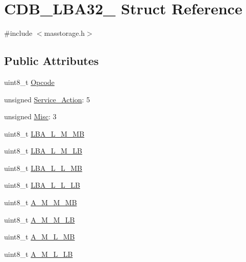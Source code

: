 \hypertarget{struct_c_d_b___l_b_a32__16}{\section{\-C\-D\-B\-\_\-\-L\-B\-A32\-\_ \-Struct \-Reference}
\label{struct_c_d_b___l_b_a32__16}
}


{\ttfamily \#include $<$masstorage.\-h$>$}

\subsection*{\-Public \-Attributes}
\begin{DoxyCompactItemize}
\item 
uint8\-\_\-t \hyperlink{struct_c_d_b___l_b_a32__16_abc471d94f83905561d961f4f90629521}{\-Opcode}
\item 
unsigned \hyperlink{struct_c_d_b___l_b_a32__16_a7e845f1253ac116a6e9d7178f1f82b6d}{\-Service\-\_\-\-Action}\-: 5
\item 
unsigned \hyperlink{struct_c_d_b___l_b_a32__16_a50e5250b635b8782b1a82f4f137feefb}{\-Misc}\-: 3
\item 
uint8\-\_\-t \hyperlink{struct_c_d_b___l_b_a32__16_a4a6ab8304338fa8af41bc180413a4c37}{\-L\-B\-A\-\_\-\-L\-\_\-\-M\-\_\-\-M\-B}
\item 
uint8\-\_\-t \hyperlink{struct_c_d_b___l_b_a32__16_af642464073c45113c7fdf221f40ade1b}{\-L\-B\-A\-\_\-\-L\-\_\-\-M\-\_\-\-L\-B}
\item 
uint8\-\_\-t \hyperlink{struct_c_d_b___l_b_a32__16_a9b4af68995d60538e2c15ce5e2c06754}{\-L\-B\-A\-\_\-\-L\-\_\-\-L\-\_\-\-M\-B}
\item 
uint8\-\_\-t \hyperlink{struct_c_d_b___l_b_a32__16_a1e239989f80f36157fd9271f2141acd1}{\-L\-B\-A\-\_\-\-L\-\_\-\-L\-\_\-\-L\-B}
\item 
uint8\-\_\-t \hyperlink{struct_c_d_b___l_b_a32__16_aceab9e7479ff5e3a7ea449a97a6e26e2}{\-A\-\_\-\-M\-\_\-\-M\-\_\-\-M\-B}
\item 
uint8\-\_\-t \hyperlink{struct_c_d_b___l_b_a32__16_afe7168380c8e629cc53432938b47f1f1}{\-A\-\_\-\-M\-\_\-\-M\-\_\-\-L\-B}
\item 
uint8\-\_\-t \hyperlink{struct_c_d_b___l_b_a32__16_a104deb61d8c0973b5140fd8f586df4e9}{\-A\-\_\-\-M\-\_\-\-L\-\_\-\-M\-B}
\item 
uint8\-\_\-t \hyperlink{struct_c_d_b___l_b_a32__16_a636ad8867ce15eb200e30fe1002f3df2}{\-A\-\_\-\-M\-\_\-\-L\-\_\-\-L\-B}
\item 

\end{DoxyCompactItemize}
